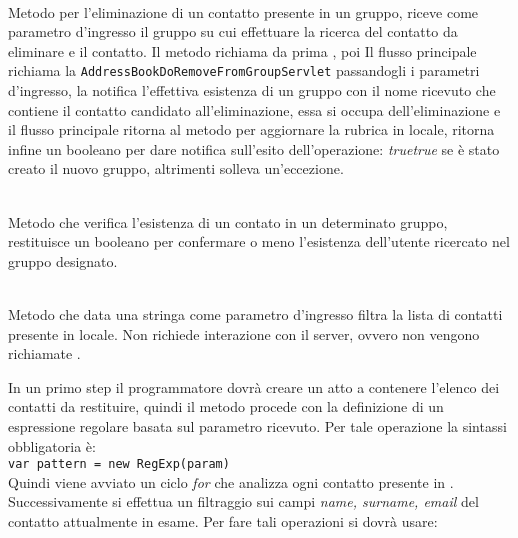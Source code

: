 \begin{description}
	\item{}\\
	Metodo per l'eliminazione di un contatto presente in un gruppo, riceve come parametro d'ingresso il gruppo su cui effettuare la ricerca del contatto da eliminare e il contatto. 
Il metodo richiama da prima , poi Il flusso principale richiama la  \texttt{AddressBookDoRemoveFromGroupServlet} passandogli i parametri d'ingresso, la  notifica l'effettiva esistenza di un gruppo con il nome ricevuto che contiene il contatto candidato all'eliminazione, essa si occupa dell'eliminazione e il flusso principale ritorna al metodo  per aggiornare la rubrica in locale, ritorna infine un  booleano per dare notifica sull'esito dell'operazione: \textit{true}\textit{true} se è stato creato il nuovo gruppo, altrimenti solleva un'eccezione.
	
	\item{}\\
Metodo che verifica l'esistenza di un contato in un determinato gruppo, restituisce un  booleano per confermare o meno l'esistenza dell'utente ricercato nel gruppo designato.

\item{}\\
Metodo che data una stringa come parametro d'ingresso filtra la lista di contatti presente in locale. Non richiede interazione con il server, ovvero non vengono richiamate .

In un primo step il programmatore dovrà creare un  atto a contenere l'elenco dei contatti da restituire, quindi il metodo procede con la definizione di un espressione regolare basata sul parametro ricevuto. Per tale operazione la sintassi obbligatoria è:\\

\verb|var pattern = new RegExp(param)|\\

Quindi viene avviato un ciclo \textit{for} che analizza ogni contatto presente in . Successivamente si effettua un filtraggio sui campi \textit{name, surname, email} del contatto attualmente in esame. Per fare tali operazioni si dovrà usare:\\


\end{description}
